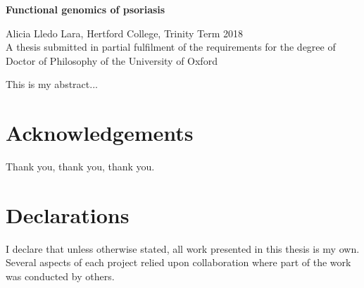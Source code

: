 \begin{center}
{{\bf Functional genomics of psoriasis}} \\
%
\end{center}
\begin{center}

{Alicia Lledo Lara, Hertford College, Trinity Term 2018}\\
{A thesis submitted in partial fulfilment of the requirements
for the degree of Doctor of Philosophy of the University of Oxford} \\
\end{center}


\noindent
This is my abstract... \\




\newpage
\chapter*{Acknowledgements}
\thispagestyle{plain}
\noindent
%
Thank you, thank you, thank you.

\newpage
\chapter*{Declarations}
\thispagestyle{plain}
\noindent
I declare that unless otherwise stated, all work presented in this thesis is my own. Several aspects of each project relied upon collaboration where part of the work was conducted by others.



